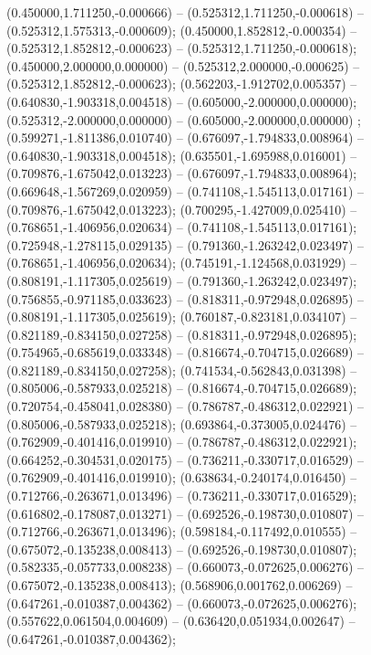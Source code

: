  (0.450000,1.711250,-0.000666) -- (0.525312,1.711250,-0.000618) -- (0.525312,1.575313,-0.000609);
 (0.450000,1.852812,-0.000354) -- (0.525312,1.852812,-0.000623) -- (0.525312,1.711250,-0.000618);
 (0.450000,2.000000,0.000000) -- (0.525312,2.000000,-0.000625) -- (0.525312,1.852812,-0.000623);
 (0.562203,-1.912702,0.005357) -- (0.640830,-1.903318,0.004518) -- (0.605000,-2.000000,0.000000);
 (0.525312,-2.000000,0.000000) -- (0.605000,-2.000000,0.000000) ;
 (0.599271,-1.811386,0.010740) -- (0.676097,-1.794833,0.008964) -- (0.640830,-1.903318,0.004518);
 (0.635501,-1.695988,0.016001) -- (0.709876,-1.675042,0.013223) -- (0.676097,-1.794833,0.008964);
 (0.669648,-1.567269,0.020959) -- (0.741108,-1.545113,0.017161) -- (0.709876,-1.675042,0.013223);
 (0.700295,-1.427009,0.025410) -- (0.768651,-1.406956,0.020634) -- (0.741108,-1.545113,0.017161);
 (0.725948,-1.278115,0.029135) -- (0.791360,-1.263242,0.023497) -- (0.768651,-1.406956,0.020634);
 (0.745191,-1.124568,0.031929) -- (0.808191,-1.117305,0.025619) -- (0.791360,-1.263242,0.023497);
 (0.756855,-0.971185,0.033623) -- (0.818311,-0.972948,0.026895) -- (0.808191,-1.117305,0.025619);
 (0.760187,-0.823181,0.034107) -- (0.821189,-0.834150,0.027258) -- (0.818311,-0.972948,0.026895);
 (0.754965,-0.685619,0.033348) -- (0.816674,-0.704715,0.026689) -- (0.821189,-0.834150,0.027258);
 (0.741534,-0.562843,0.031398) -- (0.805006,-0.587933,0.025218) -- (0.816674,-0.704715,0.026689);
 (0.720754,-0.458041,0.028380) -- (0.786787,-0.486312,0.022921) -- (0.805006,-0.587933,0.025218);
 (0.693864,-0.373005,0.024476) -- (0.762909,-0.401416,0.019910) -- (0.786787,-0.486312,0.022921);
 (0.664252,-0.304531,0.020175) -- (0.736211,-0.330717,0.016529) -- (0.762909,-0.401416,0.019910);
 (0.638634,-0.240174,0.016450) -- (0.712766,-0.263671,0.013496) -- (0.736211,-0.330717,0.016529);
 (0.616802,-0.178087,0.013271) -- (0.692526,-0.198730,0.010807) -- (0.712766,-0.263671,0.013496);
 (0.598184,-0.117492,0.010555) -- (0.675072,-0.135238,0.008413) -- (0.692526,-0.198730,0.010807);
 (0.582335,-0.057733,0.008238) -- (0.660073,-0.072625,0.006276) -- (0.675072,-0.135238,0.008413);
 (0.568906,0.001762,0.006269) -- (0.647261,-0.010387,0.004362) -- (0.660073,-0.072625,0.006276);
 (0.557622,0.061504,0.004609) -- (0.636420,0.051934,0.002647) -- (0.647261,-0.010387,0.004362);
